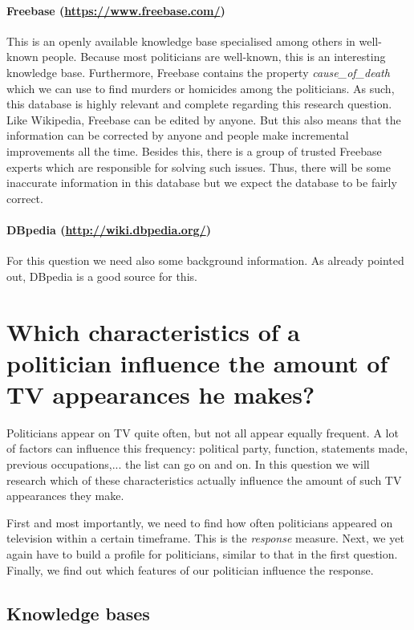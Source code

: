 \documentclass[12pt,a4paper]{article}
\begin{document}
\paragraph{\textbf{Freebase} (\url{https://www.freebase.com/})} This is an openly available knowledge base specialised among others in well-known people. Because most politicians are well-known, this is an interesting knowledge base. Furthermore, Freebase contains the property \textit{cause\_of\_death} which we can use to find murders or homicides among the politicians. As such, this database is highly relevant and complete regarding this research question. Like Wikipedia, Freebase can be edited by anyone. But this also means that the information can be corrected by anyone and people make incremental improvements all the time. Besides this, there is a group of trusted Freebase experts which are responsible for solving such issues. Thus, there will be some inaccurate information in this database but we expect the database to be fairly correct. 

\paragraph{\textbf{DBpedia} (\url{http://wiki.dbpedia.org/})}
For this question we need also some background information. As already pointed out, DBpedia is a good source for this.


\section{ \sloppy Which characteristics of a politician influence the amount of TV appearances he makes?}

Politicians appear on TV quite often, but not all appear equally frequent. A lot of factors can influence this frequency: political party, function, statements made, previous occupations,... the list can go on and on. In this question we will research which of these characteristics actually influence the amount of such TV appearances they make.
\par First and most importantly, we need to find how often politicians appeared on television within a certain timeframe. This is the \emph{response} measure. Next, we yet again have to build a profile for politicians, similar to that in the first question. Finally, we find out which features of our politician influence the response.

\subsection*{Knowledge bases}
\end{document}
